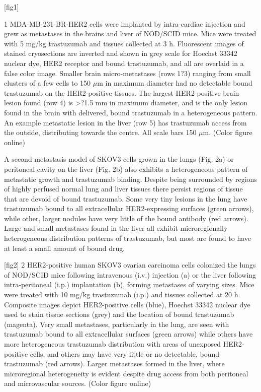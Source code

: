 [fig1]

1
MDA-MB-231-BR-HER2 cells were implanted by intra-cardiac injection and grew as metastases in the brains and liver of NOD/SCID mice.
Mice were treated with 5 mg/kg trastuzumab and tissues collected at 3 h.
Fluorescent images of stained cryosections are inverted and shown in grey scale for Hoechst 33342 nuclear dye, HER2 receptor and bound trastuzumab, and all are overlaid in a false color image.
Smaller brain micro-metastases (rows 1?3) ranging from small clusters of a few cells to 150 $\mu$m in maximum diameter had no detectable bound trastuzumab on the HER2-positive tissues.
The largest HER2-positive brain lesion found (row 4) is >?1.5 mm in maximum diameter, and is the only lesion found in the brain with delivered, bound trastuzumab in a heterogeneous pattern.
An example metastatic lesion in the liver (row 5) has trastuzumab access from the outside, distributing towards the centre.
All scale bars 150 $\mu$m.
(Color figure online)

A second metastasis model of SKOV3 cells grown in the lungs (Fig.
2a) or peritoneal cavity on the liver (Fig.
2b) also exhibits a heterogeneous pattern of metastatic growth and trastuzumab binding.
Despite being surrounded by regions of highly perfused normal lung and liver tissues there persist regions of tissue that are devoid of bound trastuzumab.
Some very tiny lesions in the lung have trastuzumab bound to all extracellular HER2-expressing surfaces (green arrows), while other, larger nodules have very little of the bound antibody (red arrows).
Large and small metastases found in the liver all exhibit microregionally heterogeneous distribution patterns of trastuzumab, but most are found to have at least a small amount of bound drug.

[fig2]
2
HER2-positive human SKOV3 ovarian carcinoma cells colonized the lungs of NOD/SCID mice following intravenous (i.v.) injection (a) or the liver following intra-peritoneal (i.p.) implantation (b), forming metastases of varying sizes.
Mice were treated with 10 mg/kg trastuzumab (i.p.) and tissues collected at 20 h.
Composite images depict HER2-positive cells (blue), Hoechst 33342 nuclear dye used to stain tissue sections (grey) and the location of bound trastuzumab (magenta).
Very small metastases, particularly in the lung, are seen with trastuzumab bound to all extracellular surfaces (green arrows) while others have more heterogeneous trastuzumab distribution with areas of unexposed HER2-positive cells, and others may have very little or no detectable, bound trastuzumab (red arrows).
Larger metastases formed in the liver, where microregional heterogeneity is evident despite drug access from both peritoneal and microvascular sources.
(Color figure online)

